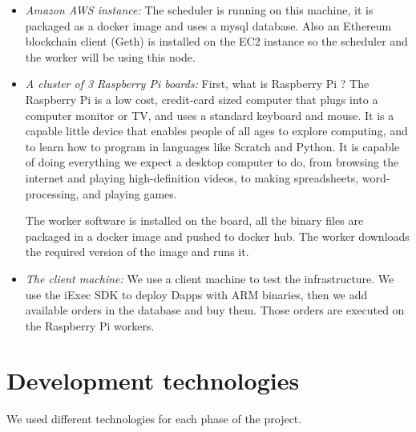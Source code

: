    \begin{itemize}
        \item \textit{Amazon AWS instance: }
        The scheduler is running on this machine, it is packaged as a docker image and uses a mysql
        database. Also an Ethereum blockchain client (Geth) is installed on the EC2 instance so the scheduler
        and the worker will be using this node.

        \item \textit{A cluster of 3 Raspberry Pi boards: }
        First, what is Raspberry Pi ? The Raspberry Pi is a low cost, credit-card sized computer that plugs
        into a computer monitor or TV, and uses a standard keyboard and mouse. It is a capable little device
        that enables people of all ages to explore computing, and to learn how to program in languages like
        Scratch and Python. It is capable of doing everything we  expect a desktop computer to do, from
        browsing the internet and playing high-definition videos, to making spreadsheets, word-processing, and
        playing games\cite{raspberry-pi}.

        The worker software is installed on the board, all the binary files are packaged in a docker image
        and pushed to docker hub. The worker downloads the required version of the image and runs it.

        \item \textit{The client machine: }
        We use a client machine to test the infrastructure. We use the iExec SDK to deploy Dapps with ARM
        binaries, then we add available orders in the database and buy them. Those orders are executed on
        the Raspberry Pi workers.
   \end{itemize}

\section{Development technologies}
    We used different technologies for each phase of the project.

